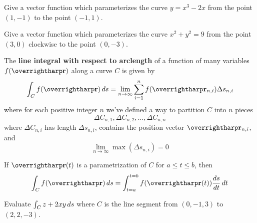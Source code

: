 \documentclass[letterpaper, twoside, 12pt]{book}
\begin{document}
          \begin{problem}
            Give a vector function which parameterizes the curve
            $y=x^3-2x$ from the point $(1,-1)$ to the point $(-1,1)$.
          \end{problem}

          \begin{solution}

          \end{solution}

          \begin{contributors}

          \end{contributors}

          \begin{problem}
            Give a vector function which parameterizes the curve
            $x^2+y^2=9$ from the point $(3,0)$ clockwise to the point $(0,-3)$.
          \end{problem}

          \begin{solution}

          \end{solution}

          \begin{contributors}

          \end{contributors}

\begin{definition}
The \textbf{line integral with respect to arclength} of a function of many
variables $f(\vect{r})$ along a curve $C$ is given by
  \[
    \int_C f(\vect{r})\dvar{s} =
    \lim_{n\to\infty}\sum_{i=1}^n f(\vect{r}_{n,i})\Delta s_{n,i}
  \]
where for each positive integer $n$ we've defined a way to partition $C$
into $n$ pieces
  \[
    \Delta C_{n,1},\Delta C_{n,2},\dots,\Delta C_{n,n}
  \]
where $\Delta C_{n,i}$ has length $\Delta s_{n,i}$, contains the position
vector $\vect{r}_{n,i}$, and
  \[
    \lim_{n\to\infty} \max(\Delta s_{n,i}) = 0
  \]
\end{definition}

\begin{theorem}
If $\vect{r}(t)$ is a parametrization of $C$ for $a \leq t \leq b$, then
  \[
    \int_C f(\vect{r})\dvar{s}
    =\int_{t=a}^{t=b} f(\vect{r}(t))\frac{ds}{dt}\dvar{t}
  \]
\end{theorem}

          \begin{problem}
            Evaluate $\int_C z + 2xy\,d{s}$ where $C$ is the line segment
            from $(0,-1,3)$ to $(2,2,-3)$.
          \end{problem}
\end{document}
